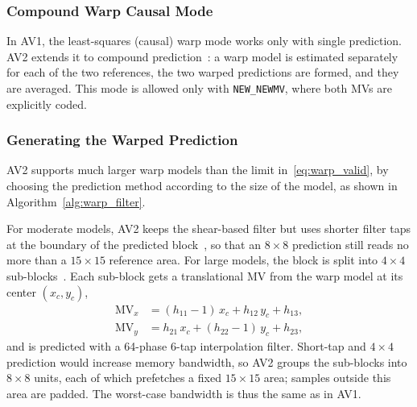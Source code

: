 \documentclass[journal]{IEEEtran}
\newcommand{\code}[1]{\texttt{#1}}
\begin{document}
\subsubsection{Compound Warp Causal Mode}
In AV1, the least-squares (causal) warp mode works only with single
prediction. AV2 extends it to compound prediction~\cite{cwgD166}: a warp model is estimated
separately for each of the two references, the two warped predictions are
formed, and they are averaged. This mode is allowed only with
\code{NEW\_NEWMV}, where both MVs are explicitly coded.

\subsubsection{Generating the Warped Prediction}
AV2 supports much larger warp models than the limit in~\eqref{eq:warp_valid},
by choosing the prediction method according to the size of the model, as
shown in Algorithm~\ref{alg:warp_filter}.

\begin{algorithm}[t]
\caption{Selection of the warped prediction method}
\label{alg:warp_filter}
\DontPrintSemicolon
{}
\end{algorithm}

For moderate models, AV2 keeps the shear-based filter but uses shorter filter
taps at the boundary of the predicted block~\cite{cwgE236}, so that an $8{\times}8$
prediction still reads no more than a $15{\times}15$ reference area. For large
models, the block is split into $4{\times}4$ sub-blocks~\cite{cwgD067}. Each sub-block gets a
translational MV from the warp model at its center $(x_c,y_c)$,
\begin{align}
  \mathrm{MV}_x &= (h_{11}-1)\,x_c + h_{12}\,y_c + h_{13}, \\
  \mathrm{MV}_y &= h_{21}\,x_c + (h_{22}-1)\,y_c + h_{23},
\end{align}
and is predicted with a 64-phase 6-tap interpolation filter. Short-tap and
$4{\times}4$ prediction would increase memory bandwidth, so AV2 groups the
sub-blocks into $8{\times}8$ units, each of which prefetches a fixed
$15{\times}15$ area; samples outside this area are padded. The worst-case
bandwidth is thus the same as in AV1.
\end{document}
